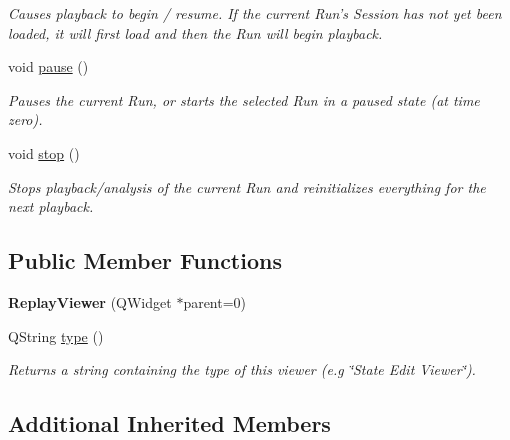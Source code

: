 \begin{DoxyCompactItemize}
\begin{DoxyCompactList}\small\item\em Causes playback to begin / resume. If the current Run's Session has not yet been loaded, it will first load and then the Run will begin playback. \end{DoxyCompactList}\item 
void \hyperlink{class_replay_viewer_aee00cc55dfe6374abefa1ce0d1f55cf1}{pause} ()
\begin{DoxyCompactList}\small\item\em Pauses the current Run, or starts the selected Run in a paused state (at time zero). \end{DoxyCompactList}\item 
\hypertarget{class_replay_viewer_acddb44efaaf9a18ff309146ea526e29c}{void \hyperlink{class_replay_viewer_acddb44efaaf9a18ff309146ea526e29c}{stop} ()}\label{class_replay_viewer_acddb44efaaf9a18ff309146ea526e29c}

\begin{DoxyCompactList}\small\item\em Stops playback/analysis of the current Run and reinitializes everything for the next playback. \end{DoxyCompactList}\end{DoxyCompactItemize}
\subsection*{Public Member Functions}
\begin{DoxyCompactItemize}
\item 
\hypertarget{class_replay_viewer_a71509a7e7dbc4df8698502e25e2130c0}{{\bfseries Replay\-Viewer} (Q\-Widget $\ast$parent=0)}\label{class_replay_viewer_a71509a7e7dbc4df8698502e25e2130c0}

\item 
\hypertarget{class_replay_viewer_a732c5edcf2502d91f67bd64166adecb1}{Q\-String \hyperlink{class_replay_viewer_a732c5edcf2502d91f67bd64166adecb1}{type} ()}\label{class_replay_viewer_a732c5edcf2502d91f67bd64166adecb1}

\begin{DoxyCompactList}\small\item\em Returns a string containing the type of this viewer (e.\-g \char`\"{}\-State Edit Viewer\char`\"{}). \end{DoxyCompactList}\end{DoxyCompactItemize}
\subsection*{Additional Inherited Members}


